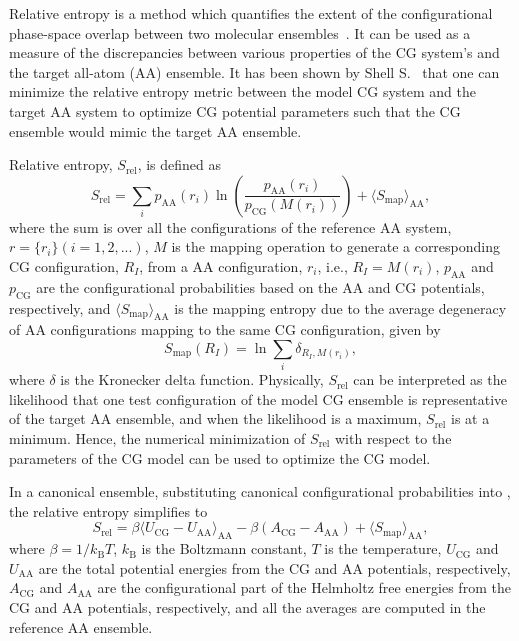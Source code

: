 Relative entropy is a method which quantifies the extent of the configurational
phase-space overlap between two molecular ensembles~\cite{Wu2005}. It can be
used as a measure of the discrepancies between various properties of the CG
system's and the target all-atom (AA) ensemble. It has been shown by Shell
S.~\cite{Shell2008} that one can minimize the relative entropy metric between
the model CG system and the target AA system to optimize CG potential parameters
such that the CG ensemble would mimic the target AA ensemble.

Relative entropy, $S_{\text{rel}}$, is defined as \cite{Shell2008}
\begin{equation}
\label{eq:srel}
S_{\text{rel}} = \sum_{i}p_{\text{AA}}(r_i) \ln\left(
  \frac{p_{\text{AA}}(r_i)}{p_{\text{CG}}\left(M(r_i)\right)}\right) +
\langle S_{\text{map}} \rangle_{\text{AA}},
\end{equation}
where the sum is over all the configurations of the reference AA system,
$r=\{r_i\} (i=1,2,...)$, $M$ is the mapping operation to generate a
corresponding CG configuration, $R_I$, from a AA configuration, $r_i$, i.e.,
$R_I = M(r_i)$, $p_\text{AA}$ and $p_\text{CG}$ are the configurational
probabilities based on the AA and CG potentials, respectively, and $ \langle
S_{\text{map}}\rangle_{\text{AA}}$ is the mapping entropy due to the average
degeneracy of AA configurations mapping to the same CG configuration, given by
\begin{equation}
\label{eq:smap}
S_{\text{map}}(R_I)=\ln\sum_{i}\delta_{R_I,M(r_i)} ,
\end{equation}
where $\delta$ is the Kronecker delta function. Physically, $S_{\text{rel}}$ can
be interpreted as the likelihood that one test configuration of the model CG
ensemble is representative of the target AA ensemble, and when the likelihood is
a maximum, $S_{\text{rel}}$ is at a minimum. Hence, the numerical minimization
of $S_{\text{rel}}$ with respect to the parameters of the CG model can be used
to optimize the CG model.

In a canonical ensemble, substituting canonical configurational probabilities
into , the relative entropy simplifies to
\begin{equation}
\label{eq:srelcan}
S_{\text{rel}}=\beta\langle U_{\text{CG}} - U_{\text{AA}}\rangle_{\text{AA}}
- \beta\left( A_{\text{CG}} - A_{\text{AA}}\right)
+ \langle S_{\text{map}}\rangle_{\text{AA}} ,
\end{equation}
where $\beta={1}/{k_{\text{B}}T}$, $k_{\text{B}}$ is the Boltzmann constant, $T$
is the temperature, $U_\text{CG}$ and $U_\text{AA}$ are the total potential
energies from the CG and AA potentials, respectively, $A_\text{CG}$ and
$A_\text{AA}$ are the configurational part of the Helmholtz free energies from
the CG and AA potentials, respectively, and all the averages are computed in the
reference AA ensemble.

